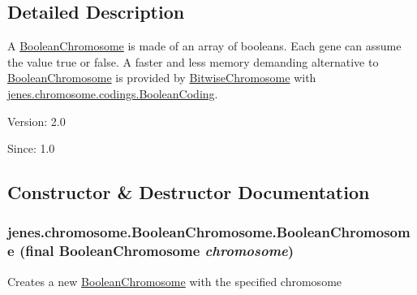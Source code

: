 \subsection{Detailed Description}
A \hyperlink{classjenes_1_1chromosome_1_1_boolean_chromosome}{BooleanChromosome} is made of an array of booleans. Each gene can assume the value true or false. A faster and less memory demanding alternative to \hyperlink{classjenes_1_1chromosome_1_1_boolean_chromosome}{BooleanChromosome} is provided by \hyperlink{classjenes_1_1chromosome_1_1_bitwise_chromosome}{BitwiseChromosome} with \hyperlink{classjenes_1_1chromosome_1_1codings_1_1_boolean_coding}{jenes.chromosome.codings.BooleanCoding}.

\begin{Desc}
\item[Version:]2.0 \end{Desc}
\begin{Desc}
\item[Since:]1.0 \end{Desc}


\subsection{Constructor \& Destructor Documentation}
\hypertarget{classjenes_1_1chromosome_1_1_boolean_chromosome_dd8b8de56dc676084576bcc657125414}{
\subsubsection[BooleanChromosome]{\setlength{\rightskip}{0pt plus 5cm}jenes.chromosome.BooleanChromosome.BooleanChromosome (final {\bf BooleanChromosome} {\em chromosome})}}
\label{classjenes_1_1chromosome_1_1_boolean_chromosome_dd8b8de56dc676084576bcc657125414}


Creates a new \hyperlink{classjenes_1_1chromosome_1_1_boolean_chromosome}{BooleanChromosome} with the specified chromosome 


